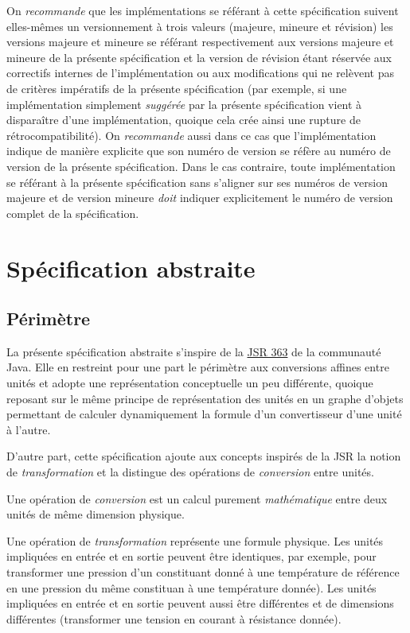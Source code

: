 \documentclass[a4paper,twoside,10pt]{article}
\begin{document}
On \emph{recommande} que les implémentations se référant à cette spécification suivent elles-mêmes un versionnement à
trois valeurs (majeure, mineure et révision) les versions majeure et mineure se référant respectivement aux versions
majeure et mineure de la présente spécification et la version de révision étant réservée aux correctifs internes de
l'implémentation ou aux modifications qui ne relèvent pas de critères impératifs de la présente spécification (par
exemple, si une implémentation simplement \emph{suggérée} par la présente spécification vient à disparaître d'une
implémentation, quoique cela crée ainsi une rupture de rétrocompatibilité). On \emph{recommande} aussi dans ce cas que
l'implémentation indique de manière explicite que son numéro de version se réfère au numéro de version de la présente
spécification. Dans le cas contraire, toute implémentation se référant à la présente spécification sans s'aligner sur
ses numéros de version majeure et de version mineure \emph{doit} indiquer explicitement le numéro de version complet de
la spécification.





\section{Spécification abstraite}

\subsection{Périmètre}

La présente spécification abstraite s'inspire de la \href{https://jcp.org/en/jsr/detail?id=363}{JSR 363} de la
communauté Java. Elle en restreint pour une part le périmètre aux conversions affines entre unités et adopte une
représentation conceptuelle un peu différente, quoique reposant sur le même principe de représentation des unités en un
graphe d'objets permettant de calculer dynamiquement la formule d'un convertisseur d'une unité à l'autre.

D'autre part, cette spécification ajoute aux concepts inspirés de la JSR la notion de \emph{transformation}
et la distingue des opérations de \emph{conversion} entre unités.

Une opération de \emph{conversion} est un calcul purement \emph{mathématique} entre deux unités de même dimension
physique.

Une opération de \emph{transformation} représente une formule physique. Les unités impliquées en entrée et en
sortie peuvent être identiques, par exemple, pour transformer une pression d'un constituant donné à une température de
référence en une pression du même constituan à une température donnée). Les unités impliquées en entrée et en sortie
peuvent aussi être différentes et de dimensions différentes (transformer une tension en courant à résistance donnée).
\end{document}
